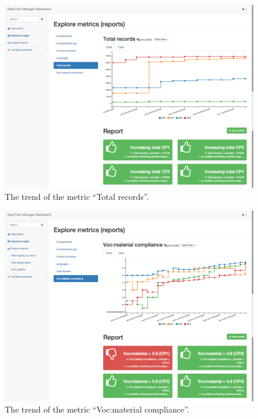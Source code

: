 \documentclass[amsthm,ebook]{saparticle}
\begin{document}
\begin{figure}[H]
\centering
\includegraphics[width=\textwidth]{img/tot.png}
\caption{The trend of the metric ``Total records''.}
\label{fig:tot}
\end{figure}

\begin{figure}[H]
\centering
\includegraphics[width=\textwidth]{img/voc.png}
\caption{The trend of the metric ``Voc:material compliance''.}
\label{fig:voc}
\end{figure}
\end{document}
